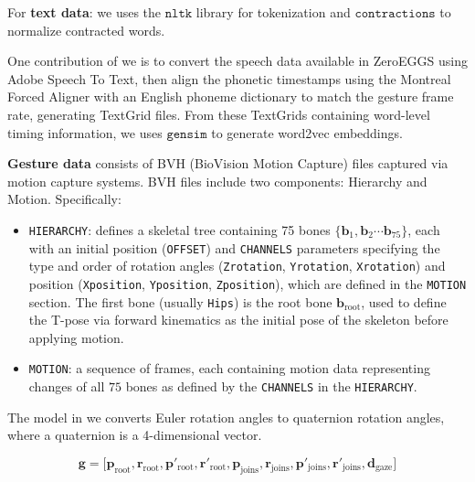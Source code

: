 For \textbf{text data}: we uses the $\texttt{nltk}$ library for tokenization and $\texttt{contractions}$ to normalize contracted words.

One contribution of we is to convert the speech data available in ZeroEGGS using Adobe Speech To Text, then align the phonetic timestamps using the Montreal Forced Aligner \cite{saxon2020robust} with an English phoneme dictionary to match the gesture frame rate, generating TextGrid files. From these TextGrids containing word-level timing information, we uses $\texttt{gensim}$ to generate word2vec embeddings.

\textbf{Gesture data} consists of BVH (BioVision Motion Capture) files captured via motion capture systems. BVH files include two components: Hierarchy and Motion. Specifically:

\begin{itemize}
	\item \texttt{HIERARCHY}: defines a skeletal tree containing 75 bones $\{ \mathbf{b}_1, \mathbf{b}_2 \cdots \mathbf{b}_{75} \}$, each with an initial position (\texttt{OFFSET}) and \texttt{CHANNELS} parameters specifying the type and order of rotation angles (\texttt{Zrotation}, \texttt{Yrotation}, \texttt{Xrotation}) and position (\texttt{Xposition}, \texttt{Yposition}, \texttt{Zposition}), which are defined in the \texttt{MOTION} section. The first bone (usually \texttt{Hips}) is the root bone $\mathbf{b}_{\text{root}}$, used to define the T-pose via forward kinematics as the initial pose of the skeleton before applying motion.
	
	\item \texttt{MOTION}: a sequence of frames, each containing motion data representing changes of all $75$ bones as defined by the \texttt{CHANNELS} in the \texttt{HIERARCHY}.
\end{itemize}

The model in we converts Euler rotation angles to quaternion rotation angles, where a quaternion is a 4-dimensional vector.

\begin{equation} \label{eq:gesturevector}
	\mathbf{g} = \Big[ \mathbf{p}_{\text{root}},  \mathbf{r}_{\text{root}},
	\mathbf{ p }'_{\text{root}},  \mathbf{r}'_{\text{root}},
	\mathbf{p}_{\text{joins}},  \mathbf{r}_{\text{joins}},
	\mathbf{p}'_{\text{joins}},  \mathbf{r}'_{\text{joins}},
	\mathbf{d}_{\text{gaze}}
	\Big]
\end{equation}

